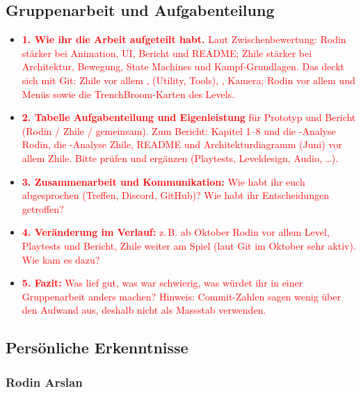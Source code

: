 \documentclass[../Main.tex]{subfiles}
\begin{document}
\subsection{Gruppenarbeit und Aufgabenteilung}

\begin{itemize}[leftmargin=1.5cm]
    \item \textcolor{red}{\textbf{1. Wie ihr die Arbeit aufgeteilt habt.} Laut Zwischenbewertung: Rodin stärker bei Animation, UI, Bericht und README; Zhile stärker bei Architektur, Bewegung, State Machines und Kampf-Grundlagen. Das deckt sich mit Git: Zhile vor allem ,  (Utility, Tools), , Kamera; Rodin vor allem  und Menüs sowie die TrenchBroom-Karten des Levels.}
    \item \textcolor{red}{\textbf{2. Tabelle Aufgabenteilung und Eigenleistung} für Prototyp und Bericht (Rodin / Zhile / gemeinsam). Zum Bericht: Kapitel 1--8 und die -Analyse Rodin, die -Analyse Zhile, README und Architekturdiagramm (Juni) vor allem Zhile. Bitte prüfen und ergänzen (Playtests, Leveldesign, Audio, \ldots).}
    \item \textcolor{red}{\textbf{3. Zusammenarbeit und Kommunikation:} Wie habt ihr euch abgesprochen (Treffen, Discord, GitHub)? Wie habt ihr Entscheidungen getroffen?}
    \item \textcolor{red}{\textbf{4. Veränderung im Verlauf:} z.\,B. ab Oktober Rodin vor allem Level, Playtests und Bericht, Zhile weiter am Spiel (laut Git im Oktober sehr aktiv). Wie kam es dazu?}
    \item \textcolor{red}{\textbf{5. Fazit:} Was lief gut, was war schwierig, was würdet ihr in einer Gruppenarbeit anders machen? Hinweis: Commit-Zahlen sagen wenig über den Aufwand aus, deshalb nicht als Massstab verwenden.}
\end{itemize}

\subsection{Persönliche Erkenntnisse}

\subsubsection{Rodin Arslan}
\end{document}
